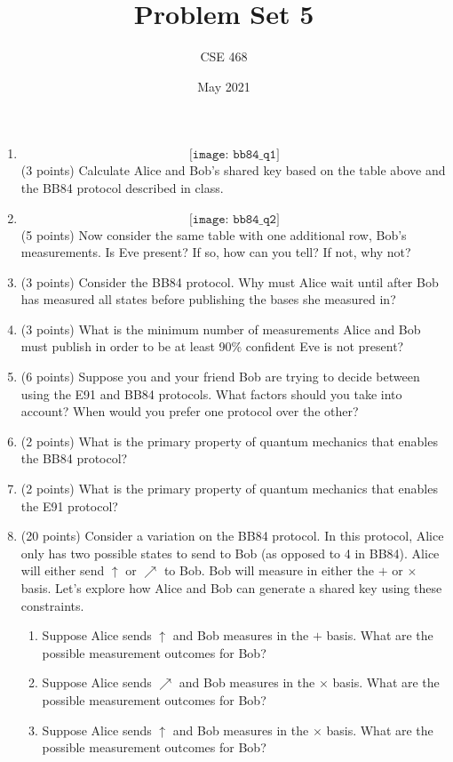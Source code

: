 \documentclass[12pt]{article}
\title{Problem Set 5}
\author{CSE 468}
\date{May 2021}
\begin{document}
\maketitle



\begin{enumerate}[font=\bfseries]
    \item \[\texttt{[image: bb84\_q1]}\]
    (3 points) Calculate Alice and Bob's shared key based on the table above and the BB84 protocol described in class.
    \item \[\texttt{[image: bb84\_q2]}\]
    (5 points) Now consider the same table with one additional row, Bob's measurements. Is Eve present? If so, how can you tell? If not, why not?
    \item (3 points) Consider the BB84 protocol. Why must Alice wait until after Bob has measured all states before publishing the bases she measured in?
    \item (3 points) What is the minimum number of measurements Alice and Bob must publish in order to be at least 90\% confident Eve is not present?
    \item (6 points) Suppose you and your friend Bob are trying to decide between using the E91 and BB84 protocols. What factors should you take into account? When would you prefer one protocol over the other?
    \item (2 points) What is the primary property of quantum mechanics that enables the BB84 protocol?
    \item (2 points) What is the primary property of quantum mechanics that enables the E91 protocol?
    \item (20 points) Consider a variation on the BB84 protocol. In this protocol, Alice only has two possible states to send to Bob (as opposed to 4 in BB84). Alice will either send $\uparrow$ or $\nearrow$ to Bob. Bob will measure in either the $+$ or $\times$ basis. Let's explore how Alice and Bob can generate a shared key using these constraints.
        \begin{enumerate}
            \item Suppose Alice sends $\uparrow$ and Bob measures in the $+$ basis. What are the possible measurement outcomes for Bob?
            \item Suppose Alice sends $\nearrow$ and Bob measures in the $\times$ basis. What are the possible measurement outcomes for Bob?
            \item Suppose Alice sends $\uparrow$ and Bob measures in the $\times$ basis. What are the possible measurement outcomes for Bob?

\end{enumerate}
\end{enumerate}
\end{document}

